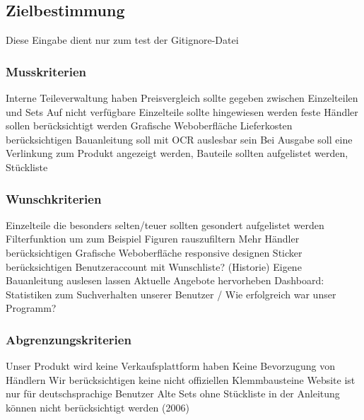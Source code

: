 \subsection{Zielbestimmung}

Diese Eingabe dient nur zum test der Gitignore-Datei

\subsubsection{Musskriterien}
Interne Teileverwaltung haben \newline
Preisvergleich sollte gegeben zwischen Einzelteilen und Sets \newline
Auf nicht verfügbare Einzelteile sollte hingewiesen werden  feste Händler sollen berücksichtigt werden \newline
Grafische Weboberfläche \newline
Lieferkosten berücksichtigen \newline
Bauanleitung soll mit OCR auslesbar sein \newline
Bei Ausgabe soll eine Verlinkung zum Produkt angezeigt werden, Bauteile sollten aufgelistet werden, Stückliste \newline

\subsubsection{Wunschkriterien}
Einzelteile die besonders selten/teuer sollten gesondert aufgelistet werden \newline
Filterfunktion um zum Beispiel Figuren rauszufiltern \newline
Mehr Händler berücksichtigen \newline
Grafische Weboberfläche responsive designen \newline
Sticker berücksichtigen \newline
Benutzeraccount mit Wunschliste? (Historie) \newline
Eigene Bauanleitung auslesen lassen \newline
Aktuelle Angebote hervorheben \newline
Dashboard: Statistiken zum Suchverhalten unserer Benutzer / Wie erfolgreich war unser Programm? \newline

\subsubsection{Abgrenzungskriterien}
Unser Produkt wird keine Verkaufsplattform haben  \newline
Keine Bevorzugung von Händlern \newline
Wir berücksichtigen keine nicht offiziellen Klemmbausteine \newline
Website ist nur für deutschsprachige Benutzer \newline
Alte Sets ohne Stückliste in der Anleitung können nicht berücksichtigt werden (2006) \newline

